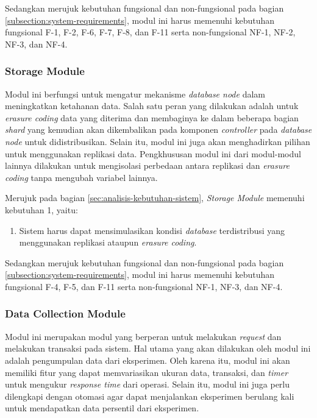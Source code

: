 Sedangkan merujuk kebutuhan fungsional dan non-fungsional pada bagian \ref{subsection:system-requirements}, modul ini harus memenuhi kebutuhan fungsional F-1, F-2, F-6, F-7, F-8, dan F-11 serta non-fungsional NF-1, NF-2, NF-3, dan NF-4.

\subsubsection{Storage Module}
\label{subsubsection:storage-module}

Modul ini berfungsi untuk mengatur mekanisme \textit{database node} dalam meningkatkan ketahanan data. Salah satu peran yang dilakukan adalah  untuk \textit{erasure coding} data yang diterima dan membaginya ke dalam beberapa bagian \textit{shard} yang kemudian akan dikembalikan pada komponen \textit{controller} pada \textit{database node} untuk didistribusikan. Selain itu, modul ini juga akan menghadirkan pilihan untuk menggunakan replikasi data. Pengkhususan modul ini dari modul-modul lainnya dilakukan untuk mengisolasi perbedaan antara replikasi dan \textit{erasure coding} tanpa mengubah variabel lainnya.

Merujuk pada bagian \ref{sec:analisis-kebutuhan-sistem}, \textit{Storage Module} memenuhi kebutuhan 1, yaitu:

\begin{enumerate}
    \item Sistem harus dapat mensimulasikan kondisi \textit{database} terdistribusi yang menggunakan replikasi ataupun \textit{erasure coding}.
\end{enumerate}

Sedangkan merujuk kebutuhan fungsional dan non-fungsional pada bagian \ref{subsection:system-requirements}, modul ini harus memenuhi kebutuhan fungsional F-4, F-5, dan F-11 serta non-fungsional NF-1, NF-3, dan NF-4.

\subsubsection{Data Collection Module}
\label{subsubsection:data-collection-module}

Modul ini merupakan modul yang berperan untuk melakukan \textit{request} dan melakukan transaksi pada sistem. Hal utama yang akan dilakukan oleh modul ini adalah pengumpulan data dari eksperimen. Oleh karena itu, modul ini akan memiliki fitur yang dapat memvariasikan ukuran data, transaksi, dan \textit{timer} untuk mengukur \textit{response time} dari operasi. Selain itu, modul ini juga perlu dilengkapi dengan otomasi agar dapat menjalankan eksperimen berulang kali untuk mendapatkan data persentil dari eksperimen.

